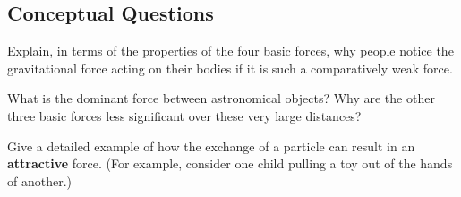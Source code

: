 \documentclass[
]{book}
\newenvironment{conceptual-questions}{}{}
\begin{document}
\hypertarget{fs-id3199417}{}
\begin{conceptual-questions}

\hypertarget{conceptual-questions-17}{%
\subsection{Conceptual Questions}\label{conceptual-questions-17}}

\hypertarget{fs-id1397916}{}
\leavevmode\hypertarget{fs-id2602098}{}%
Explain, in terms of the properties of the four basic forces, why people
notice the gravitational force acting on their bodies if it is such a
comparatively weak force.

\hypertarget{fs-id1402987}{}
\leavevmode\hypertarget{fs-id3358931}{}%
What is the dominant force between astronomical objects? Why are the
other three basic forces less significant over these very large
distances?

\hypertarget{fs-id1038237}{}
\leavevmode\hypertarget{fs-id1038256}{}%
Give a detailed example of how the exchange of a particle can result in
an \textbf{attractive} force. (For example, consider one child pulling a toy
out of the hands of another.)

\end{conceptual-questions}
\end{document}
